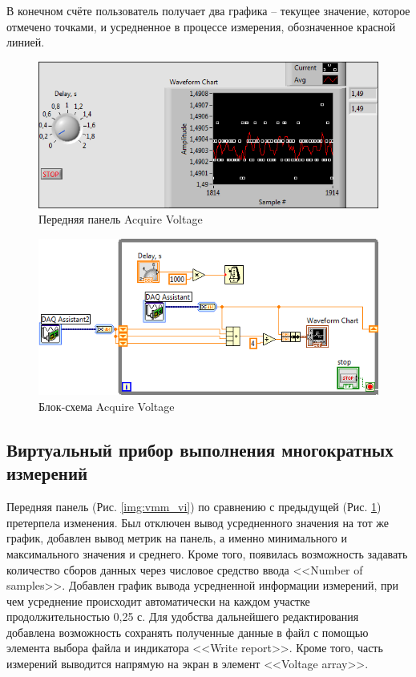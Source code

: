 \documentclass[a4paper,14pt]{article}
\begin{document}
В конечном счёте пользователь получает два графика -- текущее значение, которое отмечено точками, и усредненное в процессе измерения, обозначенное красной линией.

\begin{figure}[H]
	\centering		
	\includegraphics[width=\linewidth]{image/av_vi}
	\caption{Передняя панель Acquire Voltage}\label{img:av_vi}
\end{figure}


\begin{figure}[H]
	\centering		
	\includegraphics[width=\linewidth]{image/av_schema}
	\caption{Блок-схема Acquire Voltage}\label{img:av_schema}
\end{figure}

\subsection{Виртуальный прибор выполнения многократных измерений }

Передняя панель (Рис. \ref{img:vmm_vi})  по сравнению с предыдущей (Рис. \ref{img:av_vi}) претерпела изменения.
Был отключен вывод усредненного значения на тот же график, добавлен вывод метрик на панель, а именно минимального и максимального значения и среднего.
Кроме того, появилась возможность задавать количество сборов данных через числовое средство ввода <<Number of samples>>.
Добавлен график вывода усредненной информации измерений, при чем усреднение происходит автоматически на каждом участке продолжительностью 0,25 с.
Для удобства дальнейшего редактирования добавлена возможность сохранять полученные данные в файл с помощью элемента выбора файла и индикатора <<Write report>>.
Кроме того, часть измерений выводится напрямую на экран в элемент <<Voltage array>>.
\end{document}
